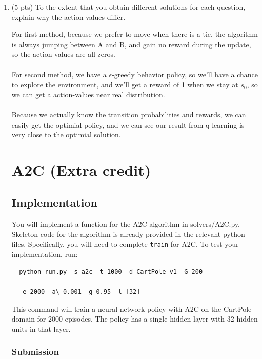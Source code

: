 \documentclass[a4paper]{article}
\theoremstyle{definition}
\newenvironment{soln}{
    \leavevmode\color{blue}\ignorespaces
}{}
\begin{document}
\begin{enumerate}
\begin{soln}
	      \end{soln}



	\item (5 pts) To the extent that you obtain different solutions for each question, explain why the action-values  differ.

	      \begin{soln}
		      For first method, because we prefer to move when there is a tie, the algorithm is always jumping between A and B, and gain no reward during the update, so the action-values are all zeros.\\\\
		      For second method, we have a $\epsilon$-greedy behavior policy, so we'll have a chance to explore the environment, and we'll get a reward of 1 when we stay at $s_0$, so we can get a action-values near real distribution.\\\\
		      Because we actually know the transition probabilities and rewards, we can easily get the optimial policy, and we can see our result from q-learning is very close to the optimial solution.
	      \end{soln}

	      \pagebreak

	      \section{A2C (Extra credit)}
	      \subsection{Implementation}

	      You will implement a function for the A2C algorithm in solvers/A2C.py.
	      Skeleton code for the algorithm is already provided in the relevant python files.
	      Specifically, you will need to complete \verb|train| for A2C.
	      To test your implementation, run:
	      \begin{verbatim}
  python run.py -s a2c -t 1000 -d CartPole-v1 -G 200 
  
  -e 2000 -a\ 0.001 -g 0.95 -l [32]
\end{verbatim}
	      This command will train a neural network policy with A2C on the CartPole domain for 2000 episodes.
	      The policy has a single hidden layer with 32 hidden units in that layer.
	      \subsubsection*{Submission}


\end{enumerate}
\end{document}
